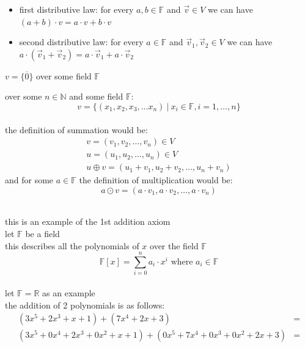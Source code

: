 \documentclass[a4paper,12pt]{article}
\begin{document}
\begin{definition}
\begin{itemize}
\item first distributive law: for every \(a,b \in \mathbb{F}\) and \(\vec{v} \in V\) we can have \((a + b) \cdot v = a \cdot v + b \cdot v\)\\
\item second distributive law: for every \(a \in \mathbb{F}\) and \(\vec{v}_1, \vec{v}_2 \in V\) we can have \(a \cdot (\vec{v}_1 + \vec{v}_2) = a \cdot \vec{v}_1 + a \cdot \vec{v}_2\)\\
\end{itemize}
\begin{my_example}
\(v = \{\overline{0}\}\) over some field \(\mathbb{F}\)\\
\end{my_example}
\begin{my_example}
over some \(n \in \mathbb{N}\) and some field \(\mathbb{F}\):\\
\[
v = \{(x_1, x_2, x_3, \ldots x_n) \ | \ x_i \in \mathbb{F}, i = 1, \ldots, n\}
\]\\
the definition of summation would be:\\
\begin{gather*}
  v = (v_1, v_2, \dots, v_n) \in V\\
  u = (u_1, u_2, \dots, u_n) \in V\\
  u \oplus v = (u_1 + v_1, u_2 + v_2, \dots, u_n + v_n)
\end{gather*}
and for some \(a \in \mathbb{F}\) the definition of multiplication would be:\\
\[
a \odot v = (a \cdot v_1, a \cdot v_2, \dots, a \cdot v_n)
\]\\
\end{my_example}
\begin{my_example}
this is an example of the 1st addition axiom\\
let \(\mathbb{F}\) be a field\\
this describes all the polynomials of \(x\) over the field \(\mathbb{F}\)\\
\[
  \mathbb{F}[x] = \sum_{i=0}^{n}a_i \cdot x^i \text{ where $a_i \in \mathbb{F}$}
\]\\
let \(\mathbb{F} = \mathbb{R}\) as an example\\
the addition of 2 polynomials is as follows:\\
\begin{align*}
(3x^5 + 2x^3 + x + 1) + (7x^4 + 2x + 3)&=\\
(3x^5 + 0x^4 + 2x^3 + 0x^2 + x + 1) + (0x^5 + 7x^4 + 0x^3 + 0x^2 + 2x + 3)&=\\

\end{align*}
\end{my_example}
\end{definition}
\end{document}
